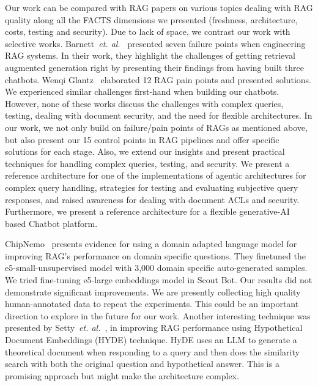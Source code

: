 \documentclass[sigconf]{acmart}
\begin{document}
Our work can be compared with RAG papers on various topics dealing with RAG quality along all the FACTS dimensions we presented (freshness, architecture, costs, testing and security). Due to lack of space, we contrast our work with selective works. Barnett~\emph{et. al.}~\cite{barnett2024seven} presented seven failure points when engineering RAG systems. In their work, they highlight the challenges of getting retrieval augmented generation right by presenting their findings from having built three chatbots. Wenqi Glantz~\cite{wq2024} elaborated 12 RAG pain points and presented solutions. We experienced similar challenges first-hand when building our chatbots. However, none of these works discuss the challenges with complex queries, testing, dealing with document security, and the need for flexible architectures. In our work, we not only build on failure/pain points of RAGs as mentioned above, but also present our 15 control points in RAG pipelines and offer specific solutions for each stage. Also, we extend our insights and present practical techniques for handling complex queries, testing, and security. We present a reference architecture for one of the implementations of agentic architectures for complex query handling, strategies for testing and evaluating subjective query responses, and raised awareness for dealing with document ACLs and security. Furthermore, we present a reference architecture for a flexible generative-AI based Chatbot platform. 

ChipNemo~\cite{liu2023chipnemo}  presents evidence for using a domain adapted language model for improving RAG’s performance on domain specific questions. They finetuned the e5-small-unsupervised model with 3,000 domain specific auto-generated samples. We tried fine-tuning e5-large embeddings model in Scout Bot. Our results did not demonstrate significant improvements. We are presently collecting high quality human-annotated data to repeat the experiments. This could be an important direction to explore in the future for our work. Another interesting technique was presented by Setty~\emph{et. al.}~\cite{setty2024improving}, in improving RAG performance using Hypothetical Document Embeddings (HYDE) technique.  HyDE uses an LLM to generate a theoretical document when responding to a query and then does the similarity search with both the original question and hypothetical answer. This is a promising approach  but might make the architecture complex. 
\end{document}
